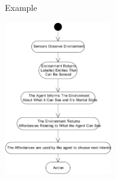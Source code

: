 \documentclass[aspectratio=1610,xcolor=dvipsnames,t]{beamer}
\begin{document}
\begin{frame}{Example} 
    \begin{center} 
        \includegraphics[width=0.35\textwidth]{example-flowchart} 
    \end{center} 
\end{frame} 
\end{document}
